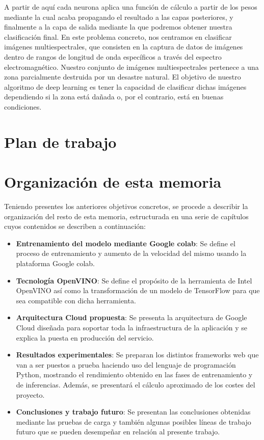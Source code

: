A partir de aquí cada neurona aplica una función de cálculo a partir de los pesos mediante la cual acaba propagando el resultado a las capas posteriores, y
finalmente a la capa de salida mediante la que podremos obtener nuestra clasificación final.
En este problema concreto, nos centramos en clasificar imágenes multiespectrales,
que consisten en la captura de datos de imágenes dentro de rangos de longitud de onda específicos a través del espectro electromagnético.
Nuestro conjunto de imágenes multiespectrales pertenece a una zona parcialmente destruida por un desastre natural.
El objetivo de nuestro algoritmo de deep learning es tener la capacidad de clasificar dichas imágenes dependiendo si la zona está dañada o,
por el contrario, está en buenas condiciones.

\section{Plan de trabajo}\label{sec:plan-de-trabajo}

\section{Organización de esta memoria}\label{sec:organización-de-esta-memoria}

Teniendo presentes los anteriores objetivos concretos, se procede a describir la organización del resto de esta memoria, estructurada en una serie de capítulos cuyos contenidos se
describen a continuación:

\begin{itemize}
    \item \textbf{Entrenamiento del modelo mediante Google colab}: Se define el proceso de entrenamiento y aumento de la velocidad del mismo usando la plataforma Google colab.
    \item \textbf{Tecnología OpenVINO}: Se define el propósito de la herramienta de Intel OpenVINO así como la transformación de un modelo de TensorFlow para que sea compatible con dicha herramienta.
    \item \textbf{Arquitectura Cloud propuesta}: Se presenta la arquitectura de Google Cloud diseñada para soportar toda la infraestructura de la aplicación y se explica la puesta en producción del servicio.
    \item \textbf{Resultados experimentales}: Se preparan los distintos frameworks web que van a ser puestos a prueba haciendo uso del lenguaje de programación Python, mostrando el rendimiento obtenido en las fases de entrenamiento y de inferencias. Además, se presentará el cálculo aproximado de los costes del proyecto.
    \item \textbf{Conclusiones y trabajo futuro}: Se presentan las conclusiones obtenidas mediante las pruebas de carga y también algunas posibles líneas de trabajo futuro que se pueden desempeñar en relación al presente trabajo.
\end{itemize}